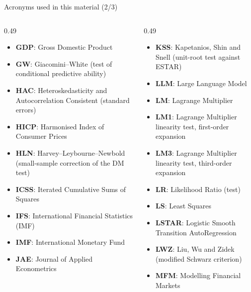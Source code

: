 \begin{frame}{Acronyms used in this material (2/3)}
\begin{columns}[T]
\begin{column}{0.49\textwidth}
\begin{itemize}\setlength{\itemsep}{0pt}
    \item \textbf{GDP}: Gross Domestic Product
    \item \textbf{GW}: Giacomini–White (test of conditional predictive ability)
    \item \textbf{HAC}: Heteroskedasticity and Autocorrelation Consistent (standard errors)
    \item \textbf{HICP}: Harmonised Index of Consumer Prices
    \item \textbf{HLN}: Harvey–Leybourne–Newbold (small-sample correction of the DM test)
    \item \textbf{ICSS}: Iterated Cumulative Sums of Squares
    \item \textbf{IFS}: International Financial Statistics (IMF)
    \item \textbf{IMF}: International Monetary Fund
    \item \textbf{JAE}: Journal of Applied Econometrics
\end{itemize}
\end{column}
\begin{column}{0.49\textwidth}
\begin{itemize}\setlength{\itemsep}{0pt}
    \item \textbf{KSS}: Kapetanios, Shin and Snell (unit-root test against ESTAR)
    \item \textbf{LLM}: Large Language Model
    \item \textbf{LM}: Lagrange Multiplier
    \item \textbf{LM1}: Lagrange Multiplier linearity test, first-order expansion
    \item \textbf{LM3}: Lagrange Multiplier linearity test, third-order expansion
    \item \textbf{LR}: Likelihood Ratio (test)
    \item \textbf{LS}: Least Squares
    \item \textbf{LSTAR}: Logistic Smooth Transition AutoRegression
    \item \textbf{LWZ}: Liu, Wu and Zidek (modified Schwarz criterion)
    \item \textbf{MFM}: Modelling Financial Markets
\end{itemize}
\end{column}
\end{columns}
\end{frame}
